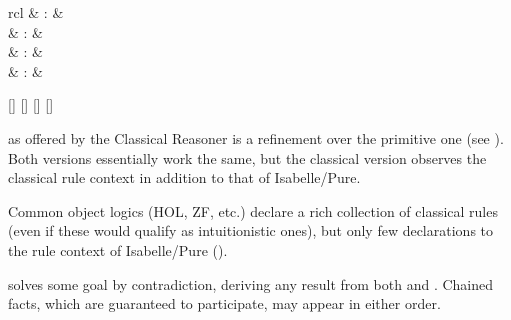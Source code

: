 \begin{isabellebody}
\begin{isamarkuptext}
\begin{description}
  \end{description}%
\end{isamarkuptext}%
\isamarkuptrue%
%
\isamarkuptrue%
%
\isamarkuptrue%
%
\begin{isamarkuptext}%
\begin{matharray}{rcl}
    \hypertarget{method.rule}{\hyperlink{method.rule}{\mbox{}}} & : &  \\
    \hypertarget{method.contradiction}{\hyperlink{method.contradiction}{\mbox{}}} & : &  \\
    \hypertarget{method.intro}{\hyperlink{method.intro}{\mbox{}}} & : &  \\
    \hypertarget{method.elim}{\hyperlink{method.elim}{\mbox{}}} & : &  \\
  \end{matharray}

  \begin{railoutput}
\rail@bar
{}[]
[]
[]
\rail@endbar
\rail@bar
{}
[]
\rail@endbar
\rail@end
\end{railoutput}


  \begin{description}

  \item \hyperlink{method.rule}{\mbox{}} as offered by the Classical Reasoner is a
  refinement over the primitive one (see ).
  Both versions essentially work the same, but the classical version
  observes the classical rule context in addition to that of
  Isabelle/Pure.

  Common object logics (HOL, ZF, etc.) declare a rich collection of
  classical rules (even if these would qualify as intuitionistic
  ones), but only few declarations to the rule context of
  Isabelle/Pure ().

  \item \hyperlink{method.contradiction}{\mbox{}} solves some goal by contradiction,
  deriving any result from both  and .  Chained
  facts, which are guaranteed to participate, may appear in either
  order.


\end{description}
\end{isamarkuptext}
\end{isabellebody}
